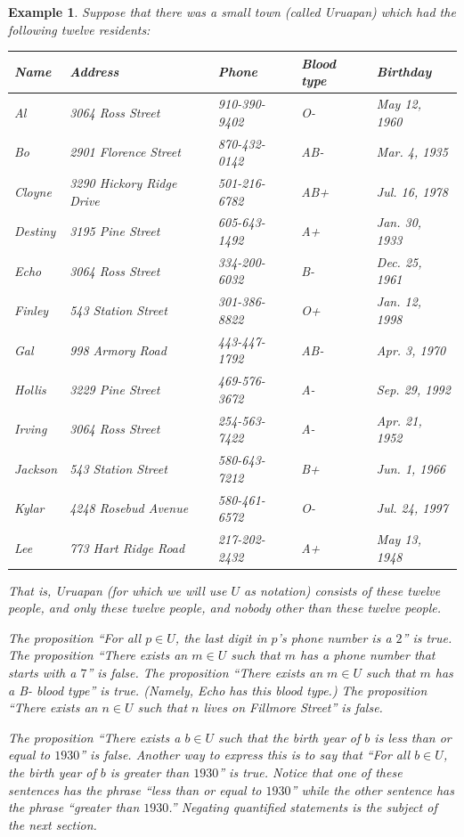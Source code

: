 \documentclass{book}
\newcounter{ekcounter}%
\theoremstyle{ekimcustom}
\newtheorem{example}[ekcounter]{Example}
\begin{document}
\begin{example}\label{example:universal-city}
Suppose that there was a small town (called Uruapan) which had the following twelve residents:
\begin{center}
\begin{tabular}{|l|l|l|l|l|}\hline
Name	&	Address	&	Phone	&	Blood type	&	Birthday	\\ \hline
Al	&	3064  Ross Street	&	910-390-9402	&	O-	&	May 12, 1960	\\ \hline
Bo	&	2901  Florence Street	&	870-432-0142	&	AB-	&	Mar. 4, 1935	\\ \hline
Cloyne	&	3290  Hickory Ridge Drive	&	501-216-6782	&	AB+	&	Jul. 16, 1978	\\ \hline
Destiny	&	3195  Pine Street	&	605-643-1492	&	A+	&	Jan. 30, 1933	\\ \hline
Echo	&	3064  Ross Street	&	334-200-6032	&	B-	&	Dec. 25, 1961	\\ \hline
Finley	&	543  Station Street	&	301-386-8822	&	O+	&	Jan. 12, 1998	\\ \hline
Gal	&	998 Armory Road	&	443-447-1792	&	AB-	&	Apr. 3, 1970	\\ \hline
Hollis	&	3229  Pine Street	&	469-576-3672	&	A-	&	Sep. 29, 1992	\\ \hline
Irving	&	3064  Ross Street	&	254-563-7422	&	A-	&	Apr. 21, 1952	\\ \hline
Jackson	&	543  Station Street	&	580-643-7212	&	B+	&	Jun. 1, 1966	\\ \hline
Kylar	&	4248 Rosebud Avenue	&	580-461-6572	&	O-	&	Jul. 24, 1997	\\ \hline
Lee	&	773  Hart Ridge Road	&	217-202-2432	&	A+	&	May 13, 1948	\\ \hline
\end{tabular}
\end{center}

That is, Uruapan (for which we will use $U$ as notation) consists of these twelve people, and only these twelve people, and nobody other than these twelve people.

The proposition ``For all $p \in U$, the last digit in $p$'s phone number is a $2$'' is true.
The proposition ``There exists an $m \in U$ such that $m$ has a phone number that starts with a $7$'' is false.
The proposition ``There exists an $m \in U$ such that $m$ has a B- blood type'' is true. (Namely, Echo has this blood type.)
The proposition ``There exists an $n \in U$ such that $n$ lives on Fillmore Street'' is false.

The proposition ``There exists a $b \in U$ such that the birth year of $b$ is less than or equal to $1930$'' is false. Another way to express this is to say that ``For all $b \in U$, the birth year of $b$ is greater than $1930$'' is true. Notice that one of these sentences has the phrase ``less than or equal to $1930$'' while the other sentence has the phrase ``greater than $1930$.'' Negating quantified statements is the subject of the next section.
\end{example}
\end{document}
